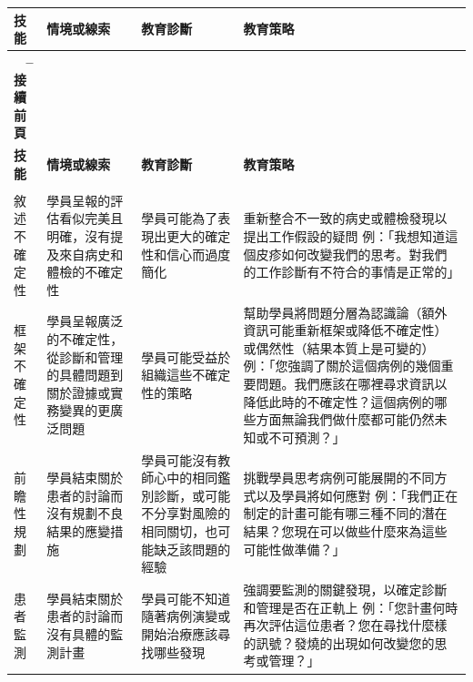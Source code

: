 \documentclass[12pt,a4paper]{article}
\begin{document}
\begin{longtable}{>{\raggedright\arraybackslash}p{3cm} >{\raggedright\arraybackslash}p{4cm} >{\raggedright\arraybackslash}p{4cm} >{\raggedright\arraybackslash}p{4cm}}
\toprule
\textbf{\textcolor{emergency_red}{技能}} & \textbf{\textcolor{emergency_red}{情境或線索}} & \textbf{\textcolor{emergency_red}{教育診斷}} & \textbf{\textcolor{emergency_red}{教育策略}} \\
\midrule
\endfirsthead

\multicolumn{4}{c}%
{{\bfseries \tablename\ \thetable{} -- 接續前頁}} \\
\toprule
\textbf{\textcolor{emergency_red}{技能}} & \textbf{\textcolor{emergency_red}{情境或線索}} & \textbf{\textcolor{emergency_red}{教育診斷}} & \textbf{\textcolor{emergency_red}{教育策略}} \\
\midrule
\endhead

\midrule \multicolumn{4}{r}{{接續下頁}} \\ \midrule
\endfoot

\bottomrule
\endlastfoot

\textcolor{emergency_blue}{敘述不確定性} & 學員呈報的評估看似完美且明確，沒有提及來自病史和體檢的不確定性 & 學員可能為了表現出更大的確定性和信心而過度簡化 & 重新整合不一致的病史或體檢發現以提出工作假設的疑問 \newline 例：「我想知道這個皮疹如何改變我們的思考。對我們的工作診斷有不符合的事情是正常的」 \\

\textcolor{emergency_blue}{框架不確定性} & 學員呈報廣泛的不確定性，從診斷和管理的具體問題到關於證據或實務變異的更廣泛問題 & 學員可能受益於組織這些不確定性的策略 & 幫助學員將問題分層為認識論（額外資訊可能重新框架或降低不確定性）或偶然性（結果本質上是可變的） \newline 例：「您強調了關於這個病例的幾個重要問題。我們應該在哪裡尋求資訊以降低此時的不確定性？這個病例的哪些方面無論我們做什麼都可能仍然未知或不可預測？」 \\

\textcolor{emergency_blue}{前瞻性規劃} & 學員結束關於患者的討論而沒有規劃不良結果的應變措施 & 學員可能沒有教師心中的相同鑑別診斷，或可能不分享對風險的相同關切，也可能缺乏該問題的經驗 & 挑戰學員思考病例可能展開的不同方式以及學員將如何應對 \newline 例：「我們正在制定的計畫可能有哪三種不同的潛在結果？您現在可以做些什麼來為這些可能性做準備？」 \\

\textcolor{emergency_blue}{患者監測} & 學員結束關於患者的討論而沒有具體的監測計畫 & 學員可能不知道隨著病例演變或開始治療應該尋找哪些發現 & 強調要監測的關鍵發現，以確定診斷和管理是否在正軌上 \newline 例：「您計畫何時再次評估這位患者？您在尋找什麼樣的訊號？發燒的出現如何改變您的思考或管理？」 \\


\end{longtable}
\end{document}
